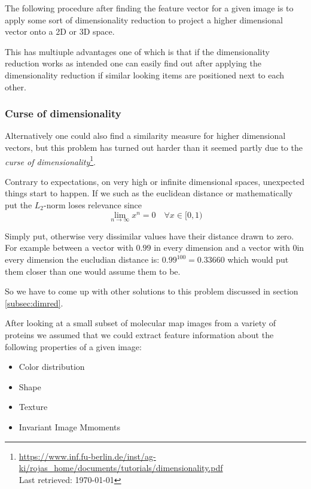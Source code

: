 \documentclass[journal]{vgtc}       %
\begin{document}
The following procedure after finding the feature vector for a given image is to apply some sort of dimensionality reduction to project a higher dimensional vector onto a 2D or 3D space.

This has multiuple advantages one of which is that if the dimensionality reduction works as intended one can easily find out after applying the dimensionality reduction if similar looking items are positioned next to each other.

\subsubsection{Curse of dimensionality}
Alternatively one could also find a similarity measure for higher dimensional vectors, but this problem has turned out harder than it seemed partly due to the \textit{curse of dimensionality}\footnote{\url{https://www.inf.fu-berlin.de/inst/ag-ki/rojas_home/documents/tutorials/dimensionality.pdf}\\ Last retrieved: \today}.


Contrary to expectations, on very high or infinite dimensional spaces, unexpected things start to happen. If we  such as the euclidean distance or mathematically put the \(L_2\)-norm loses relevance since
\begin{equation}
\lim_{n\rightarrow \infty} x^n = 0 \quad \forall x \in [0,1)
\end{equation}

Simply put, otherwise very dissimilar values have their distance drawn to zero. For example between a vector with \(0.99\) in every dimension and a vector with \(0\)in every dimension the eucludian distance is: \(0.99^{100} = 0.33660\) which would put them closer than one would assume them to be.

So we have to come up with other solutions to this problem discussed in section \ref{subsec:dimred}. %

After looking at a small subset of molecular map images from a variety of proteins we assumed that we could  extract feature information about the following properties of a given image: 
\begin{itemize}
  \item Color distribution
  \item Shape
  \item Texture
  \item Invariant  Image Mmoments 
\end{itemize}
\end{document}

